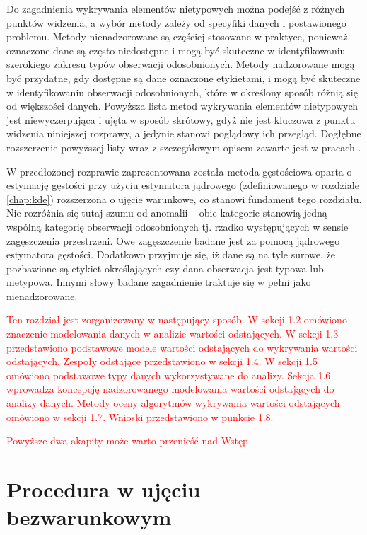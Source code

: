 \documentclass[12pt,a4paper,oneside]{book}
\theoremstyle{definition}
\begin{document}
Do zagadnienia wykrywania elementów nietypowych można podejść z różnych punktów widzenia, a wybór metody zależy od specyfiki danych i postawionego problemu. Metody nienadzorowane są częściej stosowane w praktyce, ponieważ oznaczone dane są często niedostępne i mogą być skuteczne w identyfikowaniu szerokiego zakresu typów obserwacji odosobnionych. Metody nadzorowane mogą być przydatne, gdy dostępne są dane oznaczone etykietami, i mogą być skuteczne w identyfikowaniu obserwacji odosobnionych, które w określony sposób różnią się od większości danych. Powyższa lista metod wykrywania elementów nietypowych jest niewyczerpująca i ujęta w sposób skrótowy, gdyż nie jest kluczowa z punktu widzenia niniejszej rozprawy, a jedynie stanowi poglądowy ich przegląd. Dogłębne rozszerzenie powyższej listy wraz z szczegółowym opisem zawarte jest w pracach \cite{Aggarwal_2017, Hawkins_1980, Hodge_2004, Rousseeuw_2011}.

W przedłożonej rozprawie zaprezentowana została metoda gęstościowa oparta o estymację gęstości przy użyciu estymatora jądrowego (zdefiniowanego w rozdziale \ref{chap:kde}) rozszerzona o ujęcie warunkowe, co stanowi fundament tego rozdziału. Nie rozróżnia się tutaj szumu od anomalii -- obie kategorie stanowią jedną wspólną kategorię obserwacji odosobnionych tj. rzadko występujących w sensie zagęszczenia przestrzeni. Owe zagęszczenie badane jest za pomocą jądrowego estymatora gęstości. Dodatkowo przyjmuje się, iż dane są na tyle surowe, że pozbawione są etykiet określających czy dana obserwacja jest typowa lub nietypowa. Innymi słowy badane zagadnienie traktuje się w pełni jako nienadzorowane.

\textcolor{red}{Ten rozdział jest zorganizowany w następujący sposób. W sekcji 1.2 omówiono znaczenie modelowania danych w analizie wartości odstających. W sekcji 1.3 przedstawiono podstawowe modele wartości odstających do wykrywania wartości odstających. Zespoły odstające przedstawiono w sekcji 1.4. W sekcji 1.5 omówiono podstawowe typy danych wykorzystywane do analizy. Sekcja 1.6 wprowadza koncepcję nadzorowanego modelowania wartości odstających do analizy danych. Metody oceny algorytmów wykrywania wartości odstających omówiono w sekcji 1.7. Wnioski przedstawiono w punkcie 1.8.}

\textcolor{red}{Powyższe dwa akapity może warto przenieść nad Wstęp}

\section{Procedura w ujęciu bezwarunkowym}  \label{sec:outliers_unconditional_procedure}
\end{document}
